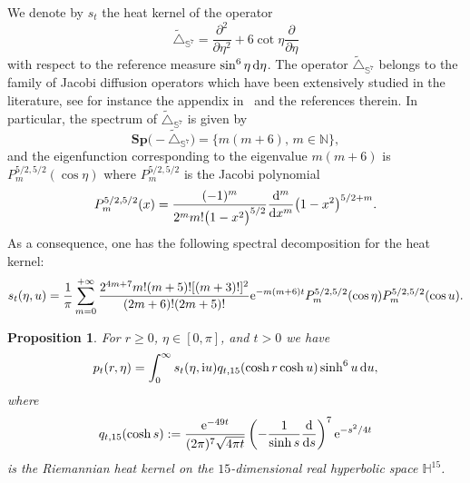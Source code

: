 \documentclass[pdftex]{sigma}
\numberwithin{equation}{section}
\newtheorem{Proposition}[Theorem]{Proposition}
 { \theoremstyle{definition}
\newtheorem{Example}[Theorem]{Example}
\newtheorem{Remark}[Theorem]{Remark} }
\begin{document}
We denote by $s_t$ the heat kernel of the operator
\begin{equation*}
\tilde{\triangle}_{\mathbb{S}^7}=\frac{{\partial}^2}{\partial {\eta}^2}+6\cot \eta\frac{{\partial}}{\partial {\eta}}
\end{equation*}
with respect to the reference measure $\sin^6\eta \, {\rm d}\eta$. The operator $\tilde{\triangle}_{\mathbb{S}^7}$ belongs to the family of Jacobi diffusion operators which have been extensively studied in the literature, see for instance the appendix in~\cite{MR3719061} and the references therein. In particular, the spectrum of $\tilde{\triangle}_{\mathbb{S}^7}$ is given by
\[
\mathbf{Sp} \big({-} \tilde{\triangle}_{\mathbb{S}^7}\big)= \{ m(m+6),\, m \in \mathbb{N} \},
\]
and the eigenfunction corresponding to the eigenvalue $m(m+6)$ is $P^{5/2,5/2}_m (\cos \eta)$ where $P^{5/2,5/2}_m$ is the Jacobi polynomial
\[
P_m^{5/2,5/2}(x)=\frac{(-1)^m}{2^mm!\big(1-x^2\big)^{5/2}}\frac{{\rm d}^m}{{\rm d}x^m}\big(1-x^2\big)^{5/2+m}.
\]
As a consequence, one has the following spectral decomposition for the heat kernel:
\begin{gather*}
s_t(\eta,u)
 =\frac{1}{{\pi}} \sum_{m=0}^{+\infty} \frac{2^{4m+7} m !(m+5)![(m+3)!]^2}{(2m+6)!(2m+5)!} {\rm e}^{-m(m+6)t}P_m^{5/2,5/2}(\cos \eta )P_m^{5/2,5/2}(\cos u).
\end{gather*}
\begin{Proposition}\label{prop:2}
For $r\geq 0$, $\eta\in [0,\pi]$, and $t >0$ we have
\begin{equation*}%
p_t(r,\eta)=\int_{0}^{\infty} s_t(\eta , {\rm i}u) q_{t,15}(\cosh r \cosh u) \sinh^6u \, {\rm d}u,
\end{equation*}
where
\begin{equation}\label{eq:riem.heat.kernel.on.H^15}
q_{t,15}(\cosh s):=\frac{{\rm e}^{-49t}}{(2\pi)^{7}\sqrt{4\pi t}}\left(-\frac{1}{\sinh s}\frac{{\rm d}}{{\rm d}s}\right)^{7}{\rm e}^{-s^2/4t}
\end{equation}
is the Riemannian heat kernel on the $15$-dimensional real hyperbolic space ${\mathbb{H}}^{15}$.
\end{Proposition}
\end{document}
